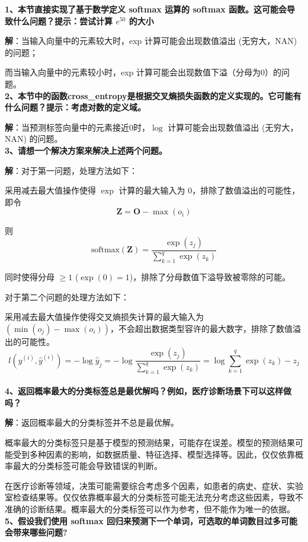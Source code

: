 \documentclass[UTF8]{ctexart}
\begin{document}
	\textbf{1、本节直接实现了基于数学定义 softmax 运算的 softmax 函数。这可能会导致什么问题？提示：尝试计算 $e^{50}$ 的大小}
	
	\noindent \textbf{解}：当输入向量中的元素较大时，exp 计算可能会出现数值溢出 (无穷大，NAN) 的问题；
	
	而当输入向量中的元素较小时，exp 计算可能会出现数值下溢（分母为0）的问题。\\
	
	\textbf{2、本节中的函数cross\_entropy是根据交叉熵损失函数的定义实现的。它可能有什么问题？提示：考虑对数的定义域。}
	
	\noindent \textbf{解}：当预测标签向量中的元素接近0时，$\log$ 计算可能会出现数值溢出 (无穷大，NAN) 的问题。\\
	
	\textbf{3、请想一个解决方案来解决上述两个问题。}
	
	\noindent \textbf{解}：对于第一问题，处理方法如下：
	
	采用减去最大值操作使得 $\exp$ 计算的最大输入为 0，排除了数值溢出的可能性，即令
	\[
	\bm{Z} = \bm{O} - \max(o_i)
	\]
	
	则
	\[
	\text{softmax}(\bm{Z}) = \frac{\exp(z_j)}{\sum_{k=1}^q \exp(z_k)}
	\]
	
	同时使得分母 $\geq 1$ ($\exp(0) = 1$)，排除了分母数值下溢导致被零除的可能。
	
	对于第二个问题的处理方法如下：
	
	采用减去最大值操作使得交叉熵损失计算的最大输入为 $(\min(o_j) - \max(o_i))$，不会超出数据类型容许的最大数字，排除了数值溢出的可能性。
	\[
	l(y^{(i)}, \hat{y}^{(i)}) = -\log \hat{y}_j = -\log \frac{\exp(z_j)}{\sum_{k=1}^q \exp(z_k)} = \log \sum_{k=1}^q \exp(z_k) - z_j
	\]\\
	
	\textbf{4、返回概率最大的分类标签总是最优解吗？例如，医疗诊断场景下可以这样做吗？}
	
	\noindent \textbf{解}：返回概率最大的分类标签并不总是最优解。
	
	概率最大的分类标签只是基于模型的预测结果，可能存在误差。模型的预测结果可能受到多种因素的影响，如数据质量、特征选择、模型选择等。因此，仅仅依靠概率最大的分类标签可能会导致错误的判断。
	
	在医疗诊断等领域，决策可能需要综合考虑多个因素，如患者的病史、症状、实验室检查结果等。仅仅依靠概率最大的分类标签可能无法充分考虑这些因素，导致不准确的诊断结果。概率最大的分类标签可以作为参考，但不能作为唯一的依据。\\
	
	\textbf{5、假设我们使用 softmax 回归来预测下一个单词，可选取的单词数目过多可能会带来哪些问题?}
	
\end{document}
